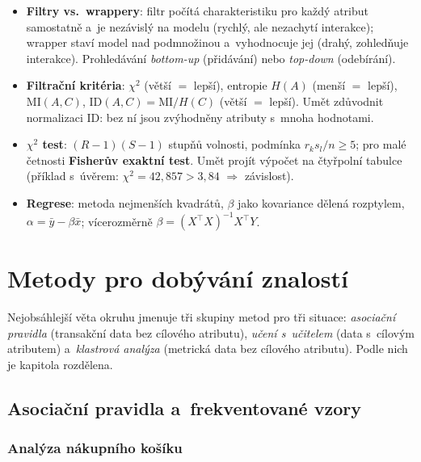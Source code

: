 \documentclass[11pt,a4paper]{article}
\theoremstyle{definition}
\begin{document}
\begin{itemize}
      interpretace) vs.\ \emph{selekce} (podmnožina původních, interpretace zůstává).
\item \textbf{Filtry vs.\ wrappery}: filtr počítá charakteristiku pro každý atribut
      samostatně a~je nezávislý na modelu (rychlý, ale nezachytí interakce); wrapper staví
      model nad podmnožinou a~vyhodnocuje jej (drahý, zohledňuje interakce). Prohledávání
      \emph{bottom-up} (přidávání) nebo \emph{top-down} (odebírání).
\item \textbf{Filtrační kritéria}: $\chi^2$ (větší $=$ lepší), entropie $H(A)$ (menší $=$
      lepší), $\mathrm{MI}(A,C)$, $\mathrm{ID}(A,C)=\mathrm{MI}/H(C)$ (větší $=$ lepší).
      Umět zdůvodnit normalizaci $\mathrm{ID}$: bez ní jsou zvýhodněny atributy s~mnoha
      hodnotami.
\item \textbf{$\chi^2$ test}: $(R-1)(S-1)$ stupňů volnosti, podmínka $r_ks_l/n\ge 5$; pro
      malé četnosti \textbf{Fisherův exaktní test}. Umět projít výpočet na čtyřpolní tabulce
      (příklad s~úvěrem: $\chi^2=42{,}857>3{,}84$ $\Rightarrow$ závislost).
\item \textbf{Regrese}: metoda nejmenších kvadrátů, $\beta$ jako kovariance dělená
      rozptylem, $\alpha=\bar y-\beta\bar x$; vícerozměrně
      $\beta=(X^{\!\top}\!X)^{-1}X^{\!\top}Y$.
\end{itemize}

\newpage
\section{Metody pro dobývání znalostí}
\label{sec:metody}

Nejobsáhlejší věta okruhu jmenuje tři skupiny metod pro tři situace: \emph{asociační pravidla}
(transakční data bez cílového atributu), \emph{učení s~učitelem} (data s~cílovým atributem)
a~\emph{klastrová analýza} (metrická data bez cílového atributu). Podle nich je kapitola
rozdělena.

\subsection{Asociační pravidla a~frekventované vzory}
\label{ssec:ar}

\subsubsection{Analýza nákupního košíku}
\end{document}
